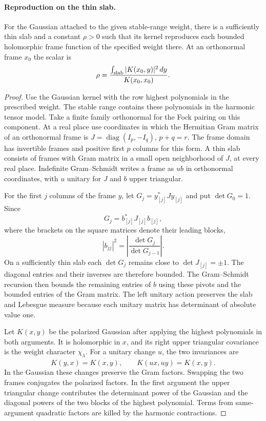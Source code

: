 \paragraph{Reproduction on the thin slab.}

\begin{lemma}\label{lem:slab-reproducing-kernel}
For the Gaussian attached to the given stable-range weight, there is
a sufficiently thin slab and a constant \(\rho>0\) such that its
kernel reproduces each bounded holomorphic frame function of the
specified weight there. At an orthonormal frame \(x_0\) the scalar is
\[
 \rho=\frac{\int_{\rm slab}|K(x_0,y)|^2\,dy}{K(x_0,x_0)} .
\]
\end{lemma}

\begin{proof}
Use the Gaussian kernel with the row highest
polynomials in the prescribed weight. The stable
range contains these polynomials in the harmonic
tensor model. Take a finite family orthonormal
for the Fock pairing on this component. At a real
place use coordinates in which the Hermitian Gram
matrix of an orthonormal frame is
\(J=\operatorname{diag}(I_p,-I_q)\), \(p+q=r\).
The frame domain has invertible frames and
positive first \(p\) columns for this form. A thin
slab consists of frames with Gram matrix in a small
open neighborhood of \(J\), at every real place.
Indefinite Gram--Schmidt writes a frame as \(u b\)
in orthonormal coordinates, with \(u\) unitary for
\(J\) and \(b\) upper triangular.

For the first \(j\) columns of the frame \(y\), let
\(G_j=y_{[j]}^*J y_{[j]}\) and put \(\det G_0=1\). Since
\[
 G_j=b_{[j]}^*J_{[j]}b_{[j]},
\]
where the brackets on the square
matrices denote their leading blocks,
\[
 |b_{jj}|^2=\left|\frac{\det G_j}{\det G_{j-1}}\right|.
\]
On a sufficiently thin slab each \(\det G_j\) remains close to
\(\det J_{[j]}=\pm1\). The diagonal entries and their inverses
are therefore bounded. The Gram--Schmidt recursion then bounds
the remaining entries of \(b\) using these pivots and the
bounded entries of the Gram matrix.
The left unitary action preserves the slab and
Lebesgue measure because each unitary matrix has
determinant of absolute value one.

Let \(K(x,y)\) be the polarized Gaussian after
applying the highest polynomials in both arguments.
It is holomorphic in \(x\), and its right upper
triangular covariance is the weight character
\(\chi_\lambda\). For a unitary change \(u\), the two invariances are
\[
 K(y,x)=\overline{K(x,y)},\qquad K(ux,uy)=K(x,y).
\]
In the Gaussian
these changes preserve the Gram factors. Swapping
the two frames conjugates the polarized factors.
In the first argument the upper triangular change
contributes the determinant power of the Gaussian
and the diagonal powers of the two blocks of the
highest polynomial. Terms from same-argument
quadratic factors are killed by the harmonic
contractions.


\end{proof}
